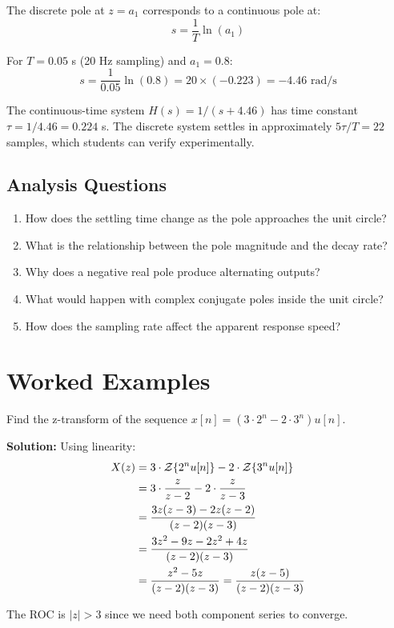 The discrete pole at $z = a_1$ corresponds to a continuous pole at:
\begin{equation}
s = \frac{1}{T} \ln(a_1)
\end{equation}

For $T = 0.05$ s (20 Hz sampling) and $a_1 = 0.8$:
\begin{equation}
s = \frac{1}{0.05} \ln(0.8) = 20 \times (-0.223) = -4.46 \text{ rad/s}
\end{equation}

The continuous-time system $H(s) = 1/(s + 4.46)$ has time constant $\tau = 1/4.46 = 0.224$ s. The discrete system settles in approximately $5\tau/T = 22$ samples, which students can verify experimentally.

\subsection{Analysis Questions}

\begin{enumerate}
    \item How does the settling time change as the pole approaches the unit circle?
    \item What is the relationship between the pole magnitude and the decay rate?
    \item Why does a negative real pole produce alternating outputs?
    \item What would happen with complex conjugate poles inside the unit circle?
    \item How does the sampling rate affect the apparent response speed?
\end{enumerate}

\section{Worked Examples}

\begin{example}
Find the z-transform of the sequence $x[n] = (3 \cdot 2^n - 2 \cdot 3^n) u[n]$.

\textbf{Solution:} Using linearity:
\begin{align}
X(z) &= 3 \cdot \mathcal{Z}\{2^n u[n]\} - 2 \cdot \mathcal{Z}\{3^n u[n]\} \\
&= 3 \cdot \frac{z}{z-2} - 2 \cdot \frac{z}{z-3} \\
&= \frac{3z(z-3) - 2z(z-2)}{(z-2)(z-3)} \\
&= \frac{3z^2 - 9z - 2z^2 + 4z}{(z-2)(z-3)} \\
&= \frac{z^2 - 5z}{(z-2)(z-3)} = \frac{z(z-5)}{(z-2)(z-3)}
\end{align}

The ROC is $|z| > 3$ since we need both component series to converge.
\end{example}


